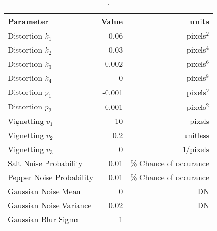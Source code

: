 \begin{table}[htbp]
  \centering
  \caption{.}
    \begin{tabular}{lrr}
    	\toprule
    Parameter & Value & units \\
    \midrule
    Distortion $k_1$ & -0.06    & pixels$^2$ \\
    Distortion $k_2$ & -0.03    & pixels$^4$ \\
    Distortion $k_3$ & -0.002    & pixels$^6$ \\
    Distortion $k_4$ & 0    & pixels$^8$ \\
    Distortion $p_1$ & -0.001    & pixels$^2$ \\
    Distortion $p_2$ & -0.001    & pixels$^2$ \\
	Vignetting $v_1$ & 10    & pixels \\	
    Vignetting $v_2$ & 0.2   & unitless \\
    Vignetting $v_3$ & 0     & 1/pixels \\
    Salt Noise Probability & 0.01 & \% Chance of occurance \\
    Pepper Noise Probability & 0.01 & \% Chance of occurance \\
    Gaussian Noise Mean & 0 & DN \\
    Gaussian Noise Variance & 0.02 & DN \\
    Gaussian Blur Sigma & 1 & \\
    \bottomrule
    \end{tabular}%
  \label{tab:postproc}%
\end{table}%